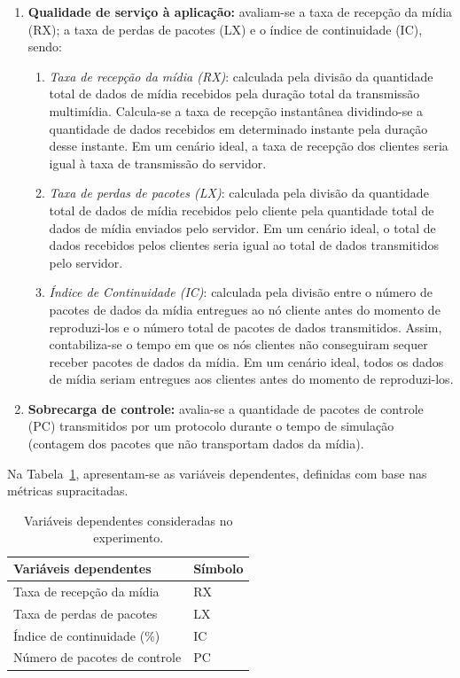 \begin{enumerate}
\item \textbf{Qualidade de serviço à aplicação:} 
	avaliam-se a taxa de recepção da mídia (RX); a taxa de perdas de pacotes (LX) e o índice de continuidade (IC), sendo:
	\begin{enumerate}
	\item \textit{Taxa de recepção da mídia (RX)}: 
		calculada pela divisão da quantidade total de dados de mídia recebidos pela duração total da transmissão multimídia. Calcula-se a taxa de recepção instantânea dividindo-se a quantidade de dados recebidos em determinado instante pela duração desse instante.
		Em um cenário ideal, a taxa de recepção dos clientes seria igual à taxa de transmissão do servidor.
	\item \textit{Taxa de perdas de pacotes (LX)}:
		calculada pela divisão da quantidade total de dados de mídia recebidos pelo cliente pela quantidade total de dados de mídia enviados pelo servidor.
		Em um cenário ideal, o total de dados recebidos pelos clientes seria igual ao total de dados transmitidos pelo servidor.
	\item \textit{Índice de Continuidade (IC)}:
		calculada pela divisão entre o número de pacotes de dados da mídia entregues ao nó cliente
		antes do momento de reproduzi-los e o número total de pacotes de dados transmitidos.
		Assim, contabiliza-se o tempo em que os nós clientes não conseguiram sequer receber pacotes de dados da mídia.
		Em um cenário ideal, todos os dados de mídia seriam entregues aos clientes antes do momento de reproduzi-los.
	\end{enumerate}
\item \textbf{Sobrecarga de controle:}
	avalia-se a quantidade de pacotes de controle (PC) transmitidos por um protocolo durante o tempo de simulação (contagem dos pacotes que não	transportam dados da mídia).
\end{enumerate}

Na Tabela~\ref{tb:variaveis-dependentes}, apresentam-se as variáveis dependentes, definidas com base nas métricas supracitadas.

\begin{table}[b!ht]
  \centering
  \caption{Variáveis dependentes consideradas no experimento.}
  \renewcommand{\arraystretch}{1}%
  \begin{tabular}{>{}m{4.1in} >{}m{1.0in}}
    \toprule
    \textbf{Variáveis dependentes} & \textbf{Símbolo} \\
    \midrule
    Taxa de recepção da mídia & RX \\
    Taxa de perdas de pacotes & LX \\
    Índice de continuidade (\%) & IC \\
    Número de pacotes de controle & PC \\
    \bottomrule
  \end{tabular}
  \label{tb:variaveis-dependentes}
\end{table}

